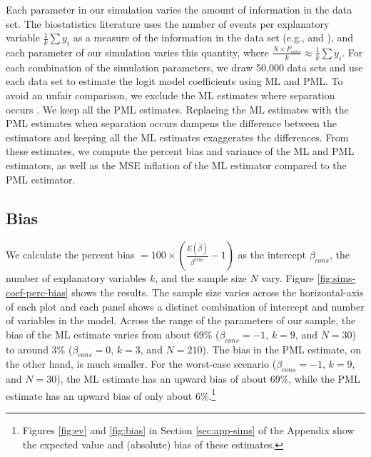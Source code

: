 \documentclass[12pt]{article}
\begin{document}
Each parameter in our simulation varies the amount of information in the data set.
The biostatistics literature uses the number of events per explanatory variable $\frac{1}{k}\sum y_i$ as a measure of the information in the data set (e.g., \citealt{Peduzzietal1996} and \citealt{VittinghoffMcCulloch2007}), and each parameter of our simulation varies this quantity, where $ \frac{N \times P_{cons}}{k} \approx \frac{1}{k}\sum y_i$.
For each combination of the simulation parameters, we draw 50,000 data sets and use each data set to estimate the logit model coefficients using ML and PML. 
To avoid an unfair comparison, we exclude the ML estimates where separation occurs \citep{Zorn2005}. 
We keep all the PML estimates.
Replacing the ML estimates with the PML estimates when separation occurs dampens the difference between the estimators and keeping all the ML estimates exaggerates the differences.
From these estimates, we compute the percent bias and variance of the ML and PML estimators, as well as the MSE inflation of the ML estimator compared to the PML estimator.

\subsection*{Bias}

We calculate the percent bias $= 100 \times \left(\frac{E(\hat{\beta})}{\beta^{true}} - 1 \right)$ as the intercept $\beta_{cons}$, the number of explanatory variables $k$, and the sample size $N$ vary.
Figure \ref{fig:sims-coef-perc-bias} shows the results.
The sample size varies across the horizontal-axis of each plot and each panel shows a distinct combination of intercept and number of variables in the model.
Across the range of the parameters of our sample, the bias of the ML estimate varies from about 69\% ($\beta_{cons} = -1$, $k = 9$, and $N = 30$) to around 3\% ($\beta_{cons} = 0$, $k = 3$, and $N = 210$).
The bias in the PML estimate, on the other hand, is much smaller.
For the worst-case scenario ($\beta_{cons} = -1$, $k = 9$, and $N = 30$), the ML estimate has an upward bias of about 69\%, while the PML estimate has an upward bias of only about 6\%.\footnote{Figures \ref{fig:ev} and \ref{fig:bias} in Section \ref{sec:app-sims} of the Appendix show the expected value and (absolute) bias of these estimates.}
\end{document}

